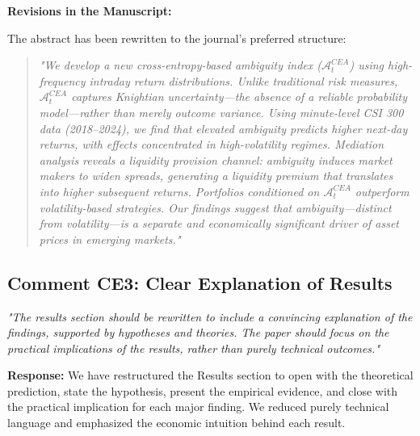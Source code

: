 \documentclass[12pt]{article}
\begin{document}
\begin{highlightbox}
\textbf{Revisions in the Manuscript:}

The abstract has been rewritten to the journal's preferred structure:
\vspace{0.2cm}
\begin{quote}
\itshape "We develop a new cross-entropy-based ambiguity index ($\mathcal{A}^{CEA}_t$) using high-frequency intraday return distributions. Unlike traditional risk measures, $\mathcal{A}^{CEA}_t$ captures Knightian uncertainty---the absence of a reliable probability model---rather than merely outcome variance. Using minute-level CSI 300 data (2018--2024), we find that elevated ambiguity predicts higher next-day returns, with effects concentrated in high-volatility regimes. Mediation analysis reveals a liquidity provision channel: ambiguity induces market makers to widen spreads, generating a liquidity premium that translates into higher subsequent returns. Portfolios conditioned on $\mathcal{A}^{CEA}_t$ outperform volatility-based strategies. Our findings suggest that ambiguity---distinct from volatility---is a separate and economically significant driver of asset prices in emerging markets."
\end{quote}
\end{highlightbox}

\subsection*{Comment CE3: Clear Explanation of Results}
\textit{"The results section should be rewritten to include a convincing explanation of the findings, supported by hypotheses and theories. The paper should focus on the practical implications of the results, rather than purely technical outcomes."}

\begin{highlightbox}
\textbf{Response:} We have restructured the Results section to open with the theoretical prediction, state the hypothesis, present the empirical evidence, and close with the practical implication for each major finding. We reduced purely technical language and emphasized the economic intuition behind each result.
\end{highlightbox}
\end{document}
